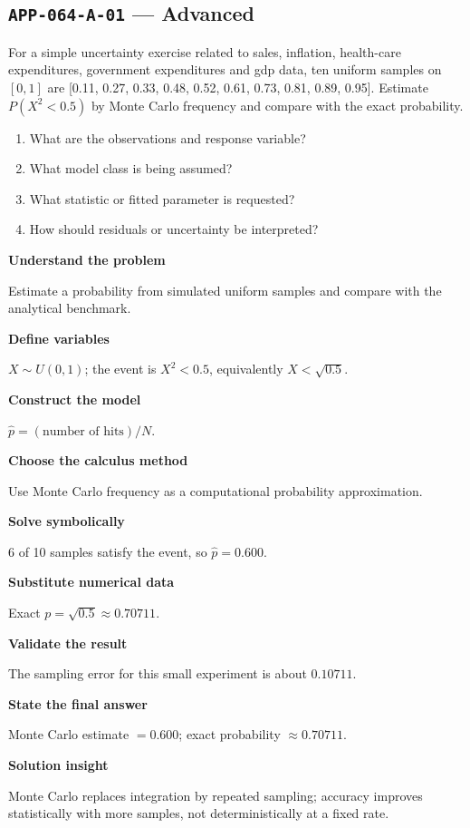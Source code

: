 \documentclass[11pt]{book}
\newcommand{\pid}[1]{\texttt{#1}}
\begin{document}
\subsection*{\pid{APP-064-A-01} — Advanced}
\begin{problembox}
For a simple uncertainty exercise related to sales, inflation, health-care expenditures, government expenditures and gdp data, ten uniform samples on $[0,1]$ are [0.11, 0.27, 0.33, 0.48, 0.52, 0.61, 0.73, 0.81, 0.89, 0.95]. Estimate $P(X^2<0.5)$ by Monte Carlo frequency and compare with the exact probability.
\end{problembox}
\begin{promptbox}\begin{enumerate}
\item What are the observations and response variable?
\item What model class is being assumed?
\item What statistic or fitted parameter is requested?
\item How should residuals or uncertainty be interpreted?
\end{enumerate}\end{promptbox}
\begin{solutionbox}
\textbf{Understand the problem}\par Estimate a probability from simulated uniform samples and compare with the analytical benchmark.\par\medskip
\textbf{Define variables}\par $X\sim U(0,1)$; the event is $X^2<0.5$, equivalently $X<\sqrt{0.5}$.\par\medskip
\textbf{Construct the model}\par $\widehat p=(\text{number of hits})/N$.\par\medskip
\textbf{Choose the calculus method}\par Use Monte Carlo frequency as a computational probability approximation.\par\medskip
\textbf{Solve symbolically}\par 6 of 10 samples satisfy the event, so $\widehat p=0.600$.\par\medskip
\textbf{Substitute numerical data}\par Exact $p=\sqrt{0.5}\approx 0.70711$.\par\medskip
\textbf{Validate the result}\par The sampling error for this small experiment is about $0.10711$.\par\medskip
\textbf{State the final answer}\par Monte Carlo estimate $=0.600$; exact probability $\approx 0.70711$.\par\medskip
\textbf{Solution insight}\par Monte Carlo replaces integration by repeated sampling; accuracy improves statistically with more samples, not deterministically at a fixed rate.\par\medskip
\end{solutionbox}
\end{document}
